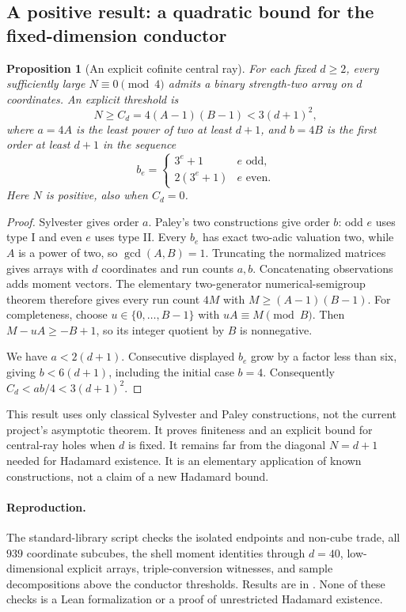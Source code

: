 \documentclass[11pt]{article}
\newtheorem{proposition}{Proposition}[section]
\begin{document}
\subsection{A positive result: a quadratic bound for the fixed-dimension conductor}
\begin{proposition}[An explicit cofinite central ray]
For each fixed $d\ge2$, every sufficiently large $N\equiv0\pmod4$
admits a binary strength-two array on $d$ coordinates. An explicit
threshold is
\[
 N\ge C_d=4(A-1)(B-1)<3(d+1)^2,
\]
where $a=4A$ is the least power of two at least $d+1$, and $b=4B$ is
the first order at least $d+1$ in the sequence
\[
 b_e=\begin{cases}3^e+1&e\text{ odd},\\2(3^e+1)&e\text{ even}.
 \end{cases}
\]
Here $N$ is positive, also when $C_d=0$.
\end{proposition}
\begin{proof}
Sylvester gives order $a$. Paley's two constructions give order $b$:
odd $e$ uses type I and even $e$ uses type II. Every $b_e$ has exact
two-adic valuation two, while $A$ is a power of two, so $\gcd(A,B)=1$.
Truncating the normalized matrices gives arrays with $d$ coordinates
and run counts $a,b$. Concatenating observations adds moment vectors.
The elementary two-generator numerical-semigroup theorem therefore
gives every run count $4M$ with $M\ge(A-1)(B-1)$. For completeness,
choose $u\in\{0,\ldots,B-1\}$ with $uA\equiv M\pmod B$. Then
$M-uA\ge-B+1$, so its integer quotient by $B$ is nonnegative.

We have $a<2(d+1)$. Consecutive displayed $b_e$ grow by a factor less
than six, giving $b<6(d+1)$, including the initial case $b=4$.
Consequently $C_d<ab/4<3(d+1)^2$.
\end{proof}
This result uses only classical Sylvester and Paley constructions, not
the current project's asymptotic theorem. It proves finiteness and an
explicit bound for central-ray holes when $d$ is fixed. It remains far
from the diagonal $N=d+1$ needed for Hadamard existence. It is an
elementary application of known constructions, not a claim of a new
Hadamard bound.

\paragraph{Reproduction.}
The standard-library script  checks the isolated
endpoints and non-cube trade, all $939$ coordinate subcubes, the shell
moment identities through $d=40$, low-dimensional explicit arrays,
triple-conversion witnesses, and sample decompositions above the
conductor thresholds. Results are in .
None of these checks is a Lean formalization or a proof of unrestricted
Hadamard existence.
\end{document}
